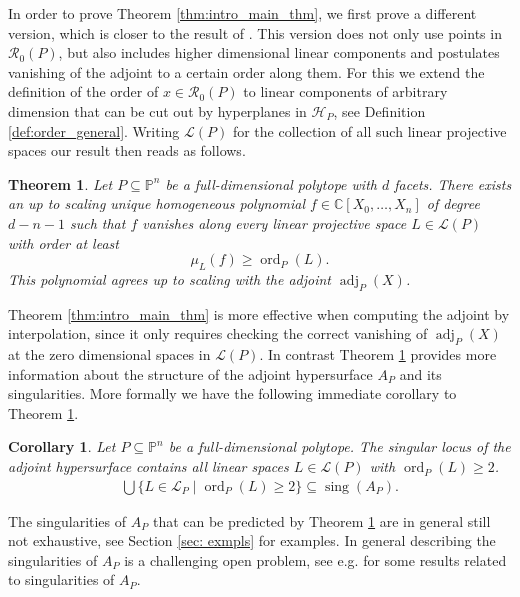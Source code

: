 \documentclass[a4paper,10pt]{amsart}
\theoremstyle{definition}
\theoremstyle{plain}
\newtheorem{thm}[defin]{Theorem}
\newtheorem{cor}[defin]{Corollary}
\newcommand{\ord}{\operatorname{ord}}
\newcommand{\adj}{\operatorname{adj}} %
\newcommand{\sing}{\operatorname{sing}}
\newcommand{\cH}{{\mathcal H}}
\newcommand{\cL}{{\mathcal L}}
\newcommand{\cR}{{\mathcal R}}
\newcommand{\C}{{\mathbb C}}
\newcommand{\pp}{\mathbb{P}}
\begin{document}
In order to prove Theorem \ref{thm:intro_main_thm}, we first prove a different version, which is closer to the result of \cite[Theorem 1]{KohnRanestad2019AdjCurves}. This version does not only use points in $\cR_0(P)$, but also includes higher dimensional linear components and postulates vanishing of the adjoint to a certain order along them. For this we extend the definition of the order of $x\in \cR_0(P)$ to linear components of arbitrary dimension that can be cut out by hyperplanes in $\cH_P$, see Definition \ref{def:order_general}. Writing $\cL(P)$ for the collection of all such linear projective spaces our result then reads as follows.
\begin{thm}
\label{thm:intro_main_allcomponents}
     Let $P\subseteq \pp^n$ be a full-dimensional polytope with $d$ facets. There exists an up to scaling unique homogeneous polynomial $f\in \C[X_0,\ldots,X_n]$ of degree $d-n-1$ such that $f$ vanishes along every linear projective space $L\in \cL(P)$ with order at least
 \begin{equation*}
    \mu_L(f)\geq \ord_P(L).
 \end{equation*}
 This polynomial agrees up to scaling with the adjoint $\adj_P(X)$.
\end{thm} 
 Theorem \ref{thm:intro_main_thm} is more effective when computing the adjoint by interpolation, since it only requires checking the correct vanishing of $\adj_P(X)$ at the zero dimensional spaces in $\cL(P)$. In contrast Theorem \ref{thm:intro_main_allcomponents} provides more information about the structure of the adjoint hypersurface $A_P$ and its singularities. More formally we have the following immediate corollary to Theorem \ref{thm:intro_main_allcomponents}. \begin{cor}
     Let $P\subseteq \pp^n$ be a full-dimensional polytope. The singular locus of the adjoint hypersurface contains all linear spaces $L\in \cL(P)$ with $\ord_P(L)\geq 2$. \begin{align*}
         \bigcup \{L\in \cL_P\mid \ord_P(L)\geq 2\}\subseteq \sing(A_P).
     \end{align*} 
 \end{cor}
 The singularities of $A_P$ that can be predicted by Theorem \ref{thm:intro_main_allcomponents} are in general still not exhaustive, see Section \ref{sec: exmpls} for examples. In general describing the singularities of $A_P$ is a challenging open problem, see e.g. \cite{Telen2025Toric} for some results related to singularities of $A_P$.  
\end{document}
